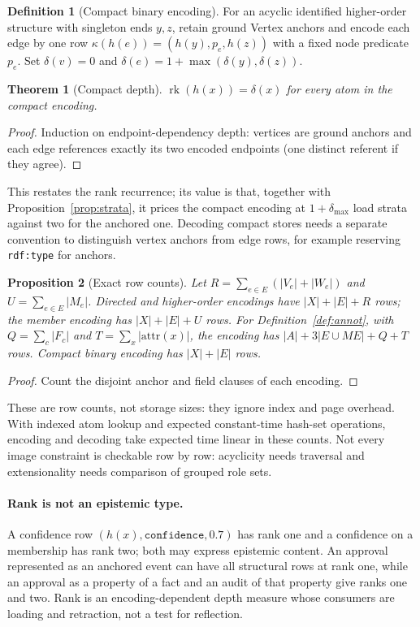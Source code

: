 \documentclass[11pt]{article}
\theoremstyle{plain}
\newtheorem{theorem}{Theorem}
\newtheorem{proposition}[theorem]{Proposition}
\theoremstyle{definition}
\newtheorem{definition}{Definition}
\theoremstyle{remark}
\newcommand{\rk}{\operatorname{rk}}
\newcommand{\iri}[1]{\texttt{#1}}
\begin{document}
\begin{definition}[Compact binary encoding]
For an acyclic identified higher-order structure with singleton ends $y,z$, retain ground
Vertex anchors and encode each edge by one row $\kappa(h(e))=(h(y),p_e,h(z))$ with a fixed
node predicate $p_e$. Set $\delta(v)=0$ and $\delta(e)=1+\max(\delta(y),\delta(z))$.
\end{definition}
\begin{theorem}[Compact depth]\label{thm:compactrank}
$\rk(h(x))=\delta(x)$ for every atom in the compact encoding.
\end{theorem}
\begin{proof}
Induction on endpoint-dependency depth: vertices are ground anchors and each edge
references exactly its two encoded endpoints (one distinct referent if they agree).
\end{proof}
This restates the rank recurrence; its value is that, together with
Proposition~\ref{prop:strata}, it prices the compact encoding at $1+\delta_{\max}$ load
strata against two for the anchored one. Decoding compact stores needs a separate
convention to distinguish vertex anchors from edge rows, for example reserving
\iri{rdf:type} for anchors.
\begin{proposition}[Exact row counts]\label{prop:size}
Let $R=\sum_{e\in E}(|V_e|+|W_e|)$ and $U=\sum_{e\in E}|M_e|$. Directed and higher-order
encodings have $|X|+|E|+R$ rows; the member encoding has $|X|+|E|+U$ rows. For
Definition~\ref{def:annot}, with $Q=\sum_c|F_c|$ and $T=\sum_x|\mathrm{attr}(x)|$, the
encoding has $|A|+3|E\cup ME|+Q+T$ rows. Compact binary encoding has $|X|+|E|$ rows.
\end{proposition}
\begin{proof}
Count the disjoint anchor and field clauses of each encoding.
\end{proof}
These are row counts, not storage sizes: they ignore index and page overhead. With indexed
atom lookup and expected constant-time hash-set operations, encoding and decoding take
expected time linear in these counts. Not every image constraint is checkable row by row:
acyclicity needs traversal and extensionality needs comparison of grouped role sets.

\paragraph{Rank is not an epistemic type.}
A confidence row $(h(x),\iri{confidence},0.7)$ has rank one and a confidence on a
membership has rank two; both may express epistemic content. An approval represented as an
anchored event can have all structural rows at rank one, while an approval as a property of
a fact and an audit of that property give ranks one and two. Rank is an encoding-dependent
depth measure whose consumers are loading and retraction, not a test for reflection.
\end{document}
